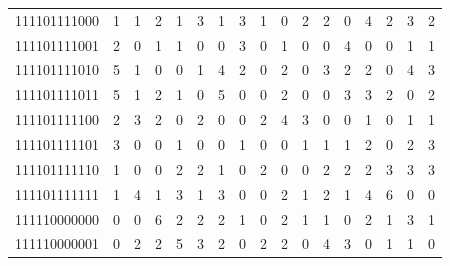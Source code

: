 \documentclass[10pt,a4paper]{article}
\begin{document}
\begin{longtable}{ |c|c|c|c|c|c|c|c|c|c|c|c|c|c|c|c|c| }
    111101111000              & 1                            & 1                                & 2                            & 1                              & 3   & 1   & 3   & 1   & 0   & 2   & 2   & 0   & 4   & 2   & 3   & 2   \\
    111101111001              & 2                            & 0                                & 1                            & 1                              & 0   & 0   & 3   & 0   & 1   & 0   & 0   & 4   & 0   & 0   & 1   & 1   \\
    111101111010              & 5                            & 1                                & 0                            & 0                              & 1   & 4   & 2   & 0   & 2   & 0   & 3   & 2   & 2   & 0   & 4   & 3   \\
    111101111011              & 5                            & 1                                & 2                            & 1                              & 0   & 5   & 0   & 0   & 2   & 0   & 0   & 3   & 3   & 2   & 0   & 2   \\
    111101111100              & 2                            & 3                                & 2                            & 0                              & 2   & 0   & 0   & 2   & 4   & 3   & 0   & 0   & 1   & 0   & 1   & 1   \\
    111101111101              & 3                            & 0                                & 0                            & 1                              & 0   & 0   & 1   & 0   & 0   & 1   & 1   & 1   & 2   & 0   & 2   & 3   \\
    111101111110              & 1                            & 0                                & 0                            & 2                              & 2   & 1   & 0   & 2   & 0   & 0   & 2   & 2   & 2   & 3   & 3   & 3   \\
    111101111111              & 1                            & 4                                & 1                            & 3                              & 1   & 3   & 0   & 0   & 2   & 1   & 2   & 1   & 4   & 6   & 0   & 0   \\
    111110000000              & 0                            & 0                                & 6                            & 2                              & 2   & 2   & 1   & 0   & 2   & 1   & 1   & 0   & 2   & 1   & 3   & 1   \\
    111110000001              & 0                            & 2                                & 2                            & 5                              & 3   & 2   & 0   & 2   & 2   & 0   & 4   & 3   & 0   & 1   & 1   & 0   \\

\end{longtable}
\end{document}
